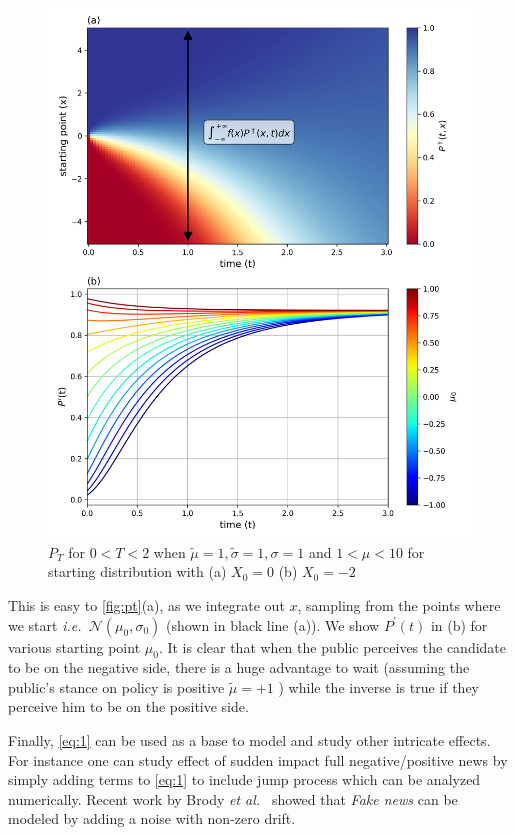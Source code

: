 \documentclass[aps,prl,twocolumn,showpacs,final]{revtex4-2}
\newcommand{\etal}{\textit{et al.\ }}
\newcommand{\ie}{\textit{i.e.\ }}
\newcommand\pN{\mathcal{N}}
\begin{document}
\begin{figure}[!h]
\includegraphics[width=\columnwidth]{figs/Pt.png}
\caption{ $P_T$ for $0<T<2$ when $\tilde{\mu}=1,\tilde{\sigma}=1,\sigma=1$ and $1<\mu<10$ for starting distribution with (a) $X_0=0$ (b) $X_0=-2$ }
\label{fig:pt}
\end{figure}

This is easy to \autoref{fig:pt}(a), as we integrate out $x$, sampling from the points where we start \ie  $\pN(\mu_{0},\sigma_0)$ (shown in black line (a)). We show $P^\prime (t)$ in (b) for various starting point $\mu_0$. It is clear that when the public perceives the candidate to be on the negative side, there is a huge advantage to wait (assuming the public's stance on policy is positive $\tilde{\mu}=+1$ ) while the inverse is true if they perceive him to be on the positive side. 

Finally, \eqref{eq:1} can be used as a base to model and study other intricate effects. For instance one can study effect of sudden impact full negative/positive news by simply adding terms to \eqref{eq:1} to include jump process which can be analyzed numerically. Recent work by Brody \etal\cite{brody2018model} showed that \textit{Fake news} can be modeled by adding a noise with non-zero drift. 
\end{document}
